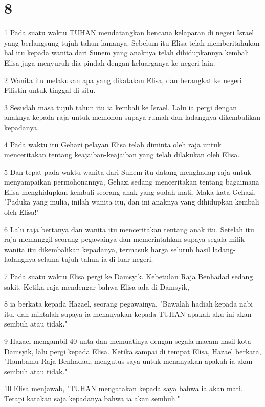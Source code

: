 \chapter{8}

\par 1 Pada suatu waktu TUHAN mendatangkan bencana kelaparan di negeri Israel yang berlangsung tujuh tahun lamanya. Sebelum itu Elisa telah memberitahukan hal itu kepada wanita dari Sunem yang anaknya telah dihidupkannya kembali. Elisa juga menyuruh dia pindah dengan keluarganya ke negeri lain.
\par 2 Wanita itu melakukan apa yang dikatakan Elisa, dan berangkat ke negeri Filistin untuk tinggal di situ.
\par 3 Sesudah masa tujuh tahun itu ia kembali ke Israel. Lalu ia pergi dengan anaknya kepada raja untuk memohon supaya rumah dan ladangnya dikembalikan kepadanya.
\par 4 Pada waktu itu Gehazi pelayan Elisa telah diminta oleh raja untuk menceritakan tentang keajaiban-keajaiban yang telah dilakukan oleh Elisa.
\par 5 Dan tepat pada waktu wanita dari Sunem itu datang menghadap raja untuk menyampaikan permohonannya, Gehazi sedang menceritakan tentang bagaimana Elisa menghidupkan kembali seorang anak yang sudah mati. Maka kata Gehazi, "Paduka yang mulia, inilah wanita itu, dan ini anaknya yang dihidupkan kembali oleh Elisa!"
\par 6 Lalu raja bertanya dan wanita itu menceritakan tentang anak itu. Setelah itu raja memanggil seorang pegawainya dan memerintahkan supaya segala milik wanita itu dikembalikan kepadanya, termasuk harga seluruh hasil ladang-ladangnya selama tujuh tahun ia di luar negeri.
\par 7 Pada suatu waktu Elisa pergi ke Damsyik. Kebetulan Raja Benhadad sedang sakit. Ketika raja mendengar bahwa Elisa ada di Damsyik,
\par 8 ia berkata kepada Hazael, seorang pegawainya, "Bawalah hadiah kepada nabi itu, dan mintalah supaya ia menanyakan kepada TUHAN apakah aku ini akan sembuh atau tidak."
\par 9 Hazael mengambil 40 unta dan memuatinya dengan segala macam hasil kota Damsyik, lalu pergi kepada Elisa. Ketika sampai di tempat Elisa, Hazael berkata, "Hambamu Raja Benhadad, mengutus saya untuk menanyakan apakah ia akan sembuh atau tidak."
\par 10 Elisa menjawab, "TUHAN mengatakan kepada saya bahwa ia akan mati. Tetapi katakan saja kepadanya bahwa ia akan sembuh."
